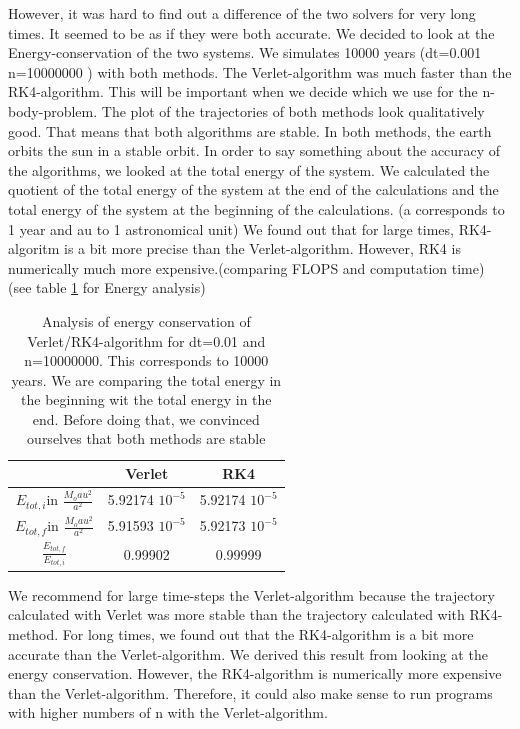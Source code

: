 \documentclass[10pt,a4paper]{article}
\begin{document}
However, it was hard to find out a difference of the two solvers for very long times. It seemed to be as if they were both accurate. We decided to look at the Energy-conservation of the two systems. We simulates 10000 years (dt=0.001 n=10000000 ) with both methods. The Verlet-algorithm was much faster than the RK4-algorithm. This will be important when we decide which we use for the n-body-problem. 
The plot of the trajectories of both methods look qualitatively good. That means that both algorithms are stable. In both methods, the earth orbits the sun in a stable orbit. 
In order to say something about the accuracy of the algorithms, we looked at the total energy of the system. We calculated the quotient of the total energy of the system at the end of the calculations and the total energy of the system at the beginning of the calculations. (a corresponds to 1 year and au to 1 astronomical unit) We found out that for large times, RK4-algoritm is a bit more precise than the Verlet-algorithm. However, RK4 is numerically much more expensive.(comparing FLOPS and computation time) (see table \ref{TWOB_Energy_analysis} for Energy analysis) 
\begin{table}[h]
\centering
\caption{Analysis of energy conservation of Verlet/RK4-algorithm for dt=0.01 and n=10000000. This corresponds to 10000 years. We are comparing the total energy in the beginning wit the total energy in the end. Before doing that, we convinced ourselves that both methods are stable \label{TWOB_Energy_analysis}}
\begin{tabular}{c|c|c}
&Verlet & RK4 \\
\hline \hline
$E_{tot,i}$in $\frac{M_o au^2}{a^2}$ &5.92174 $10^{-5}$ &5.92174 $10^{-5}$ \\
$E_{tot,f}$in $\frac{M_o au^2}{a^2}$ &5.91593 $10^{-5}$ &5.92173 $10^{-5}$ \\
\hline
$\frac{E_{tot,f}}{E_{tot,i}}$ & 0.99902& 0.99999\\
\end{tabular}
\end{table}

We recommend for large time-steps the Verlet-algorithm because the trajectory calculated with Verlet was more stable than the trajectory calculated with RK4-method. 
For long times, we found out that the RK4-algorithm is a bit more accurate than the Verlet-algorithm. We derived this result from looking at the energy conservation. However, the RK4-algorithm is numerically more expensive than the Verlet-algorithm. Therefore, it could also make sense to run programs with higher numbers of n with the Verlet-algorithm.
\end{document}
